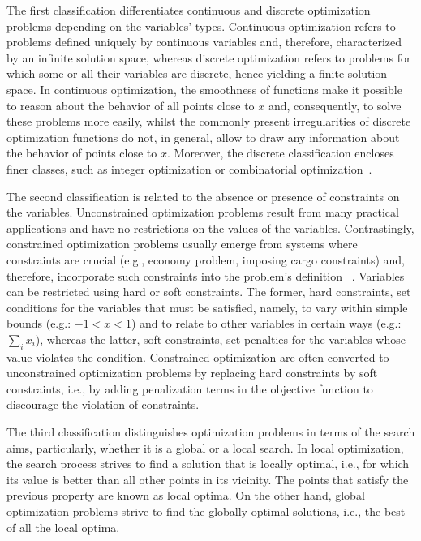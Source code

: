 	The first classification differentiates continuous and discrete optimization problems depending on the variables' types. Continuous optimization refers to problems defined uniquely by continuous variables and, therefore, characterized by an infinite solution space, whereas discrete optimization refers to problems for which some or all their variables are discrete, hence yielding a finite solution space. In continuous optimization, the smoothness of functions make it possible to reason about the behavior of all points close to $x$ and, consequently, to solve these problems more easily, whilst the commonly present irregularities of discrete optimization functions do not, in general, allow to draw any information about the behavior of points close to $x$. Moreover, the discrete classification encloses finer classes, such as integer optimization or combinatorial optimization~\cite{Nemhauser1988}. 
	
	The second classification is related to the absence or presence of constraints on the variables. Unconstrained optimization problems result from many practical applications and have no restrictions on the values of the variables. Contrastingly, constrained optimization problems usually emerge from systems where constraints are crucial (e.g., economy problem, imposing cargo constraints) and, therefore, incorporate such constraints into the problem's definition ~\cite{Nocedal2011NumericalOptimization}. Variables can be restricted using hard or soft constraints. The former, hard constraints, set conditions for the variables that must be satisfied, namely, to vary within simple bounds (e.g.: $-1<x<1$) and to relate to other variables in certain ways (e.g.: $\sum_{i} x_i$), whereas the latter, soft constraints, set penalties for the variables whose value violates the condition. Constrained optimization are often converted to unconstrained optimization problems by replacing hard constraints by soft constraints, i.e., by adding penalization terms in the objective function to discourage the violation of constraints. 
	
	The third classification distinguishes optimization problems in terms of the search aims, particularly, whether it is a global or a local search. In local optimization, the search process strives to find a solution that is locally optimal, i.e., for which its value is better than all other points in its vicinity. The points that satisfy the previous property are known as local optima. On the other hand, global optimization problems strive to find the globally optimal solutions, i.e., the best of all the local optima.

